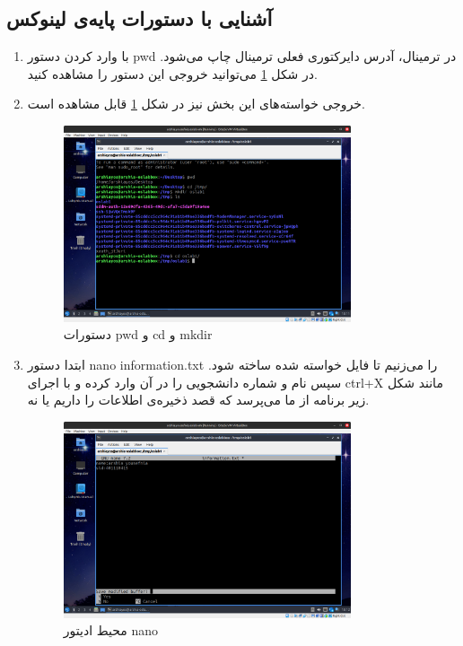 \documentclass[12pt]{article}
\begin{document}
        \subsection{آشنایی با دستورات پایه‌ی لینوکس}
        
        \begin{enumerate}
        \item با وارد کردن دستور 
        \textenglish{pwd}
        در ترمینال، آدرس دایرکتوری فعلی ترمینال چاپ می‌شود. در شکل
        \ref{im10}
        می‌توانید خروجی این دستور را مشاهده کنید.

        \item خروجی خواسته‌های این بخش نیز در شکل
        \ref{im10}
        قابل مشاهده است.

        \begin{figure}[H]
		\centering
		\includegraphics[width=0.8\textwidth]{report1-resources/10.png}
		\caption{دستورات \textenglish{pwd} و \textenglish{cd} و \textenglish{mkdir}}
            \label{im10}
	\end{figure}

        \item 
        ابتدا دستور
        \textenglish{nano information.txt}
        را می‌زنیم تا فایل خواسته شده ساخته شود. سپس نام و شماره دانشجویی را در آن وارد کرده و با اجرای
        \textenglish{ctrl+X}
        مانند شکل زیر برنامه از ما می‌پرسد که قصد ذخیره‌ی اطلاعات را داریم یا نه.
        
        \begin{figure}[H]
		\centering
		\includegraphics[width=0.8\textwidth]{report1-resources/11.png}
		\caption{محیط ادیتور \textenglish{nano}}
	\end{figure}


\end{enumerate}
\end{document}

